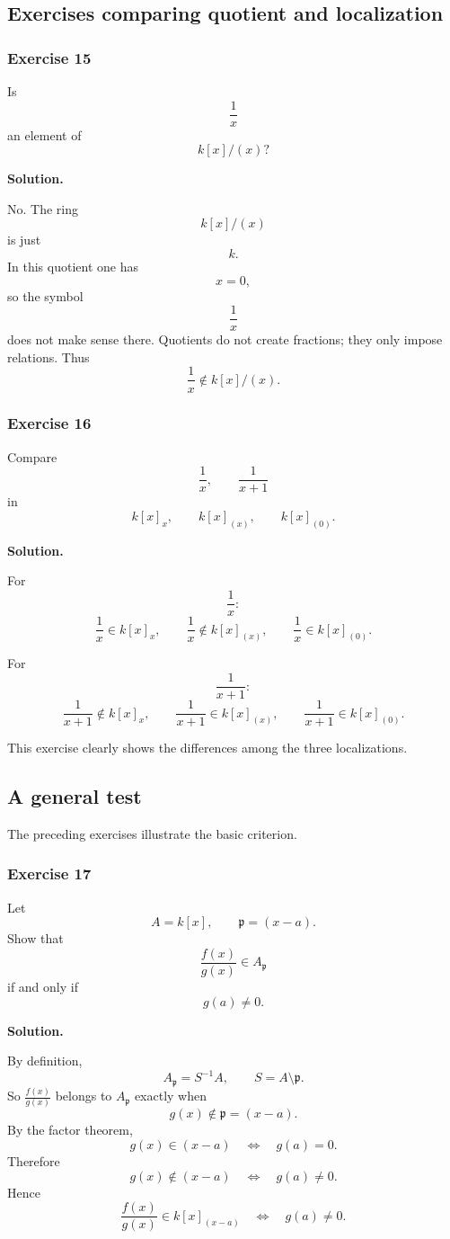 \documentclass[12pt,a4paper]{article}
\theoremstyle{notespace}
\theoremstyle{definition}
\begin{document}
\subsection{Exercises comparing quotient and localization}

\subsubsection{Exercise 15}

Is
\[
\frac{1}{x}
\]
an element of
\[
k[x]/(x)?
\]

\textbf{Solution.}

No. The ring
\[
k[x]/(x)
\]
is just
\[
k.
\]
In this quotient one has
\[
x=0,
\]
so the symbol
\[
\frac{1}{x}
\]
does not make sense there. Quotients do not create fractions; they only impose relations. Thus
\[
\frac{1}{x}\notin k[x]/(x).
\]

\subsubsection{Exercise 16}

Compare
\[
\frac{1}{x},
\qquad
\frac{1}{x+1}
\]
in
\[
k[x]_x,
\qquad
k[x]_{(x)},
\qquad
k[x]_{(0)}.
\]

\textbf{Solution.}

For
\[
\frac{1}{x}:
\]
\[
\frac{1}{x}\in k[x]_x,
\qquad
\frac{1}{x}\notin k[x]_{(x)},
\qquad
\frac{1}{x}\in k[x]_{(0)}.
\]

For
\[
\frac{1}{x+1}:
\]
\[
\frac{1}{x+1}\notin k[x]_x,
\qquad
\frac{1}{x+1}\in k[x]_{(x)},
\qquad
\frac{1}{x+1}\in k[x]_{(0)}.
\]

This exercise clearly shows the differences among the three localizations.

\subsection{A general test}

The preceding exercises illustrate the basic criterion.

\subsubsection{Exercise 17}

Let
\[
A=k[x],
\qquad
\mathfrak p=(x-a).
\]
Show that
\[
\frac{f(x)}{g(x)}\in A_{\mathfrak p}
\]
if and only if
\[
g(a)\neq 0.
\]

\textbf{Solution.}

By definition,
\[
A_{\mathfrak p}=S^{-1}A,
\qquad
S=A\setminus \mathfrak p.
\]
So \(\frac{f(x)}{g(x)}\) belongs to \(A_{\mathfrak p}\) exactly when
\[
g(x)\notin \mathfrak p=(x-a).
\]
By the factor theorem,
\[
g(x)\in (x-a)
\quad\Longleftrightarrow\quad
g(a)=0.
\]
Therefore
\[
g(x)\notin (x-a)
\quad\Longleftrightarrow\quad
g(a)\neq 0.
\]
Hence
\[
\frac{f(x)}{g(x)}\in k[x]_{(x-a)}
\quad\Longleftrightarrow\quad
g(a)\neq 0.
\]
\end{document}
